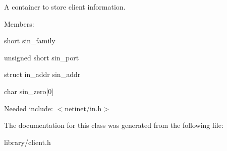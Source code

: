 A container to store client information. 

Members\+:
\begin{DoxyItemize}
\item {\ttfamily short} sin\+\_\+family
\item {\ttfamily unsigned short} sin\+\_\+port
\item {\ttfamily struct} in\+\_\+addr sin\+\_\+addr
\item {\ttfamily char} sin\+\_\+zero\mbox{[}0\mbox{]}
\end{DoxyItemize}

Needed include\+: {\ttfamily $<$netinet/in.\+h$>$} 

The documentation for this class was generated from the following file\+:\begin{DoxyCompactItemize}
\item 
library/client.\+h\end{DoxyCompactItemize}
